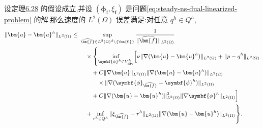 \begin{theorem}\label{thm:steady-ns-fem-error-velocity-l2}
设定理\hyperref[thm:steady-ns-fem-error-gradient]{6.28} 的假设成立,并设 $(\symbf{\phi}_{\widehat{\bm{f}}},\xi_{\widehat{\bm{f}}})$ 是问题\cref{eq:steady-ns-dual-linearized-problem} 的解.那么速度的 $L^2(\Omega)$ 误差满足:对任意 $q^h\in Q^h$,
\begin{equation}\label{eq:steady-ns-fem-error-velocity-l2}
{\small
\begin{aligned}
  \|\bm{u}-\bm{u}^h\|_{L^2(\Omega)}
  \le{}&\sup_{\widehat{\bm{f}}\in L^2(\Omega)^d\setminus\{\bm{0}\}}
        \frac1{\|\widehat{\bm{f}}\|_{L^2(\Omega)}}\\
        &\quad\times\Biggl\{
        \inf_{\symbf{\phi}^h\in V_{\mathrm{div}}^h}
        \Bigl[\nu\|\nabla(\bm{u}-\bm{u}^h)\|_{L^2(\Omega)}
             +\|p-q^h\|_{L^2(\Omega)}\\
       &\qquad+C\|\nabla\bm{u}\|_{L^2(\Omega)}
             \|\nabla(\bm{u}-\bm{u}^h)\|_{L^2(\Omega)}\\
       &\qquad\quad\times\|\nabla(\symbf{\phi}_{\widehat{\bm{f}}}
                            -\symbf{\phi}^h)\|_{L^2(\Omega)}\\
       &\qquad+C\|\nabla(\bm{u}-\bm{u}^h)\|_{L^2(\Omega)}^2
             \|\nabla\symbf{\phi}^h\|_{L^2(\Omega)}\Bigr]\\
       &\quad+\inf_{r^h\in Q^h}
             \|\xi_{\widehat{\bm{f}}}-r^h\|_{L^2(\Omega)}
             \|\nabla(\bm{u}-\bm{u}^h)\|_{L^2(\Omega)}\Biggr\}.
 \end{aligned}
}
\end{equation}
\end{theorem}


